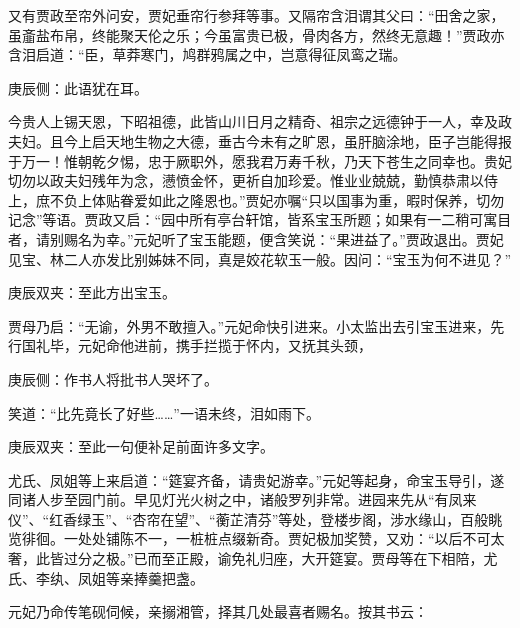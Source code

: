 \begin{parag}
    又有贾政至帘外问安，贾妃垂帘行参拜等事。又隔帘含泪谓其父曰：“田舍之家，虽齑盐布帛，终能聚天伦之乐；今虽富贵已极，骨肉各方，然终无意趣！”贾政亦含泪启道：“臣，草莽寒门，鸠群鸦属之中，岂意得征凤鸾之瑞。\begin{note}庚辰侧：此语犹在耳。\end{note}今贵人上锡天恩，下昭祖德，此皆山川日月之精奇、祖宗之远德钟于一人，幸及政夫妇。且今上启天地生物之大德，垂古今未有之旷恩，虽肝脑涂地，臣子岂能得报于万一！惟朝乾夕惕，忠于厥职外，愿我君万寿千秋，乃天下苍生之同幸也。贵妃切勿以政夫妇残年为念，懑愤金怀，更祈自加珍爱。惟业业兢兢，勤慎恭肃以侍上，庶不负上体贴眷爱如此之隆恩也。”贾妃亦嘱“只以国事为重，暇时保养，切勿记念”等语。贾政又启：“园中所有亭台轩馆，皆系宝玉所题；如果有一二稍可寓目者，请别赐名为幸。”元妃听了宝玉能题，便含笑说：“果进益了。”贾政退出。贾妃见宝、林二人亦发比别姊妹不同，真是姣花软玉一般。因问：“宝玉为何不进见？”\begin{note}庚辰双夹：至此方出宝玉。\end{note}贾母乃启：“无谕，外男不敢擅入。”元妃命快引进来。小太监出去引宝玉进来，先行国礼毕，元妃命他进前，携手拦揽于怀内，又抚其头颈，\begin{note}庚辰侧：作书人将批书人哭坏了。\end{note}笑道：“比先竟长了好些……”一语未终，泪如雨下。\begin{note}庚辰双夹：至此一句便补足前面许多文字。\end{note}
\end{parag}


\begin{parag}
    尤氏、凤姐等上来启道：“筵宴齐备，请贵妃游幸。”元妃等起身，命宝玉导引，遂同诸人步至园门前。早见灯光火树之中，诸般罗列非常。进园来先从“有凤来仪”、“红香绿玉”、“杏帘在望”、“蘅芷清芬”等处，登楼步阁，涉水缘山，百般眺览徘徊。一处处铺陈不一，一桩桩点缀新奇。贾妃极加奖赞，又劝：“以后不可太奢，此皆过分之极。”已而至正殿，谕免礼归座，大开筵宴。贾母等在下相陪，尤氏、李纨、凤姐等亲捧羹把盏。
\end{parag}


\begin{parag}
    元妃乃命传笔砚伺候，亲搦湘管，择其几处最喜者赐名。按其书云：
\end{parag}


